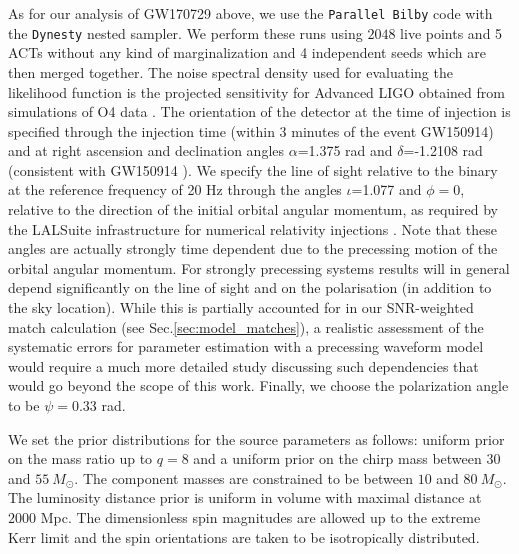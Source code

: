 \documentclass[%
aps,
prd,
amssymb,
amsmath,
amsfonts,
eqsecnum,
showpacs,
nofootinbib,
floatfix,
twocolumn,
twoside,
a4paper,
superscriptaddress
]{revtex4-1}
\begin{document}
As for our analysis of GW170729 above, we use the \texttt{Parallel Bilby} code \cite{Smith:2019ucc} with the \texttt{Dynesty} \cite{Speagle:2020spe} nested sampler. 
We perform these runs using $2048$ live points and 5 ACTs without any kind of marginalization and 4 independent seeds which are then merged together. The noise spectral density used for evaluating the likelihood function is the projected sensitivity for Advanced LIGO obtained from simulations of O4 data \cite{PSDs_NRinj}. The orientation of the detector at the time of injection is specified through the injection time (within 3 minutes of the event GW150914) and at right ascension and declination angles  $\alpha$=1.375 rad and  $\delta$=-1.2108 rad (consistent with GW150914 \cite{Abbott:2016blz}). 
We specify the line of sight relative to the binary at the reference frequency of 20 Hz through the angles $\iota$=1.077 and $\phi=0$, relative to the direction of the initial orbital angular momentum, as required by the LALSuite infrastructure for numerical relativity injections \cite{Schmidt:2017btt}. Note that these angles are actually strongly time dependent due to the precessing motion of the orbital angular momentum. For strongly precessing systems results will in general depend significantly on the line of sight and on the polarisation (in addition to the sky location). While this is partially accounted for in our SNR-weighted match calculation (see Sec.\ref{sec:model_matches}), a realistic assessment of the systematic errors for parameter estimation with a precessing waveform model would require a much more detailed study discussing such dependencies that would go beyond the scope of this work. Finally, we choose the polarization angle to be $\psi=0.33$ rad.


We set the prior distributions for the source parameters as follows:
uniform prior on the mass ratio up to $q=8$ and a uniform prior on the chirp mass between $30$ and $55~M_{\odot}$. The component masses are constrained to be between $10$ and $80~M_{\odot}$. The luminosity distance prior is uniform in volume with maximal distance at $2000$ Mpc. The dimensionless spin magnitudes are allowed up to the extreme Kerr limit and the spin orientations are taken to be isotropically distributed.
\end{document}
